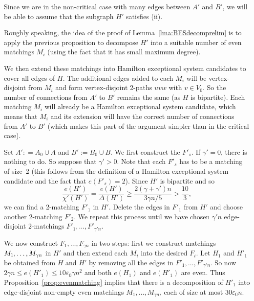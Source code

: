 \documentclass{memo-l}
\def\COMMENT#1{}
\def\eps{\varepsilon}
\def\epszero{\eps_0}
\numberwithin{section}{chapter}
\numberwithin{equation}{section}
\numberwithin{firstthm}{section}
\numberwithin{figure}{section}
\begin{document}
{Since we are in the non-critical case with many edges between $A'$ and $B'$, we will be able to assume that the subgraph $H'$
satisfies (ii).

Roughly speaking, the idea of the proof of Lemma~\ref{lma:BESdecomprelim} is to apply the previous proposition to decompose $H'$ into a suitable number of even matchings 
$M_i$ (using the fact that it has small maximum degree).%
\COMMENT{AL: rephrased the following sentences}
We then extend these matchings into Hamilton exceptional system candidates to cover all edges of $H$.
The additional edges added to each $M_i$ will be vertex-disjoint from $M_i$ and form vertex-disjoint 2-paths $uvw$ with $v \in V_0$.
So the number of connections from $A'$ to $B'$ remains the same (as $H$ is bipartite).
Each matching $M_i$ will already be a Hamilton exceptional system candidate, which means that $M_i$ and its extension will have the correct number of connections from $A'$ to $B'$ 
(which makes this part of the argument simpler than in the critical case).

\removelastskip{}\medskip{}
Set $A': = A_0 \cup A$ and $B':= B_0 \cup B$. We first construct the $F'_s$.
If $\gamma '=0$, there is nothing to do. So suppose that $\gamma ' >0$.
Note that each $F'_s$ has to be a matching of size~2 (this follows from the definition of a Hamilton exceptional system candidate and the
fact that $e(F'_s) = 2$).
Since $H'$ is bipartite and so
$$\frac{e(H')}{\chi '(H')}=\frac{e(H')}{\Delta(H')}\ge \frac{2( \gamma +  \gamma' )n}{3 \gamma n /5} > \frac{10}{3},$$
we can find a 2-matching $F'_1$ in $H'$. Delete the edges in $F'_1$ from $H'$ and choose another 2-matching $F'_2$.
We repeat this process until we have chosen $\gamma'n$ edge-disjoint $2$-matchings $F'_1, \dots ,F'_{\gamma'n}$.

We now construct  $F_1, \dots ,F_{\gamma n}$ in two steps: first we construct matchings $M_1,\break \dots,M_{\gamma n}$ in $H'$
and then extend each $M_i$ into the desired $F_i$.
Let $H_1$ and $H'_1$ be obtained from $H$ and $H'$ by removing all the edges in $F'_1, \dots ,F'_{\gamma'n}$.
So now $2\gamma n \le e(H'_1) \le 10 \epszero \gamma n^2 $ and both $e(H_1)$ and $e(H'_1)$ are even. Thus Proposition~\ref{prop:evenmatching}
implies that there is a decomposition of $H'_1$ into edge-disjoint non-empty even matchings $M_1, \dots ,M_{\gamma n }$,
each of size at most $30 \epszero  n$. 

}
\end{document}
